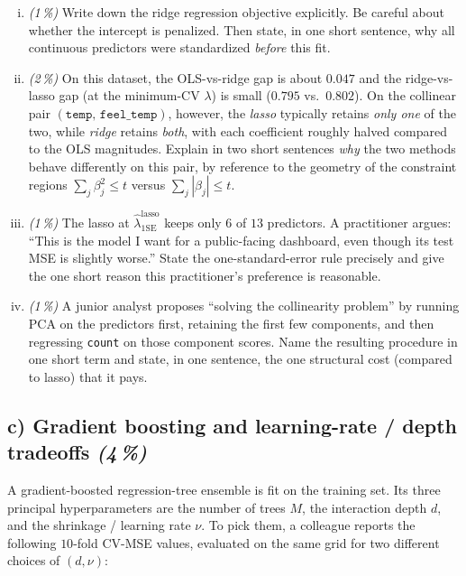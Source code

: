\documentclass[11pt,a4paper]{article}
\newcommand{\subpoints}[1]{\textit{(#1\,\%)}}
\begin{document}
\begin{enumerate}[(i)]
  \item \subpoints{1} Write down the ridge regression objective explicitly. Be careful about whether the intercept is penalized. Then state, in one short sentence, why all continuous predictors were standardized \emph{before} this fit.

  \item \subpoints{2} On this dataset, the OLS-vs-ridge gap is about $0.047$ and the ridge-vs-lasso gap (at the minimum-CV $\lambda$) is small ($0.795$ vs.\ $0.802$). On the collinear pair $(\texttt{temp},\, \texttt{feel\_temp})$, however, the \emph{lasso} typically retains \emph{only one} of the two, while \emph{ridge} retains \emph{both}, with each coefficient roughly halved compared to the OLS magnitudes. Explain in two short sentences \emph{why} the two methods behave differently on this pair, by reference to the geometry of the constraint regions $\sum_j \beta_j^2 \le t$ versus $\sum_j |\beta_j| \le t$.

  \item \subpoints{1} The lasso at $\hat\lambda_{1\mathrm{SE}}^{\text{lasso}}$ keeps only $6$ of $13$ predictors. A practitioner argues: ``This is the model I want for a public-facing dashboard, even though its test MSE is slightly worse.'' State the one-standard-error rule precisely and give the one short reason this practitioner's preference is reasonable.

  \item \subpoints{1} A junior analyst proposes ``solving the collinearity problem'' by running PCA on the predictors first, retaining the first few components, and then regressing \texttt{count} on those component scores. Name the resulting procedure in one short term and state, in one sentence, the one structural cost (compared to lasso) that it pays.
\end{enumerate}

\subsection*{c) Gradient boosting and learning-rate / depth tradeoffs \subpoints{4}}

A gradient-boosted regression-tree ensemble is fit on the training set. Its three principal hyperparameters are the number of trees $M$, the interaction depth $d$, and the shrinkage / learning rate $\nu$. To pick them, a colleague reports the following $10$-fold CV-MSE values, evaluated on the same grid for two different choices of $(d, \nu)$:
\end{document}
